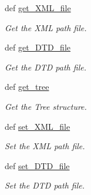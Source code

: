 \begin{CompactItemize}
def \hyperlink{classwinsollib_1_1DataFile_d170e6164cbd6ecc3368a74e7e21ad2f}{get\_\-XML\_\-file}
\begin{CompactList}\small\item\em Get the XML path file. \item\end{CompactList}\item 
def \hyperlink{classwinsollib_1_1DataFile_180e6a2106958fc221b476ee5ea443cd}{get\_\-DTD\_\-file}
\begin{CompactList}\small\item\em Get the DTD path file. \item\end{CompactList}\item 
def \hyperlink{classwinsollib_1_1DataFile_f9deb4c156634e7b17f945142493897b}{get\_\-tree}
\begin{CompactList}\small\item\em Get the Tree structure. \item\end{CompactList}\item 
def \hyperlink{classwinsollib_1_1DataFile_8b0dbebbb0dff05ac6afdadc68584bcb}{set\_\-XML\_\-file}
\begin{CompactList}\small\item\em Set the XML path file. \item\end{CompactList}\item 
def \hyperlink{classwinsollib_1_1DataFile_9942934eecb74d9bed46a9be94141418}{set\_\-DTD\_\-file}
\begin{CompactList}\small\item\em Set the DTD path file. \item\end{CompactList}\end{CompactItemize}
